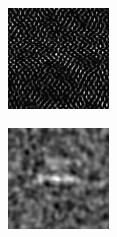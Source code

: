 \documentclass{article}
\begin{document}
\begin{figure}[h!]
\begin{subfigure}[b]{0.1\textwidth}
    \end{subfigure}
    \hspace{-1\baselineskip}
    \quad
    \begin{subfigure}[b]{0.1\textwidth}   
        \centering 
        \includegraphics[width=\textwidth]{plots/D_lin_SE2_template.jpg}

    \end{subfigure}
    \hspace{-1\baselineskip}
    \quad
    \begin{subfigure}[b]{0.1\textwidth}   
        \centering 
        \includegraphics[width=\textwidth]{plots/E_lin_SE2_template.jpg}


\end{subfigure}
\end{figure}
\end{document}
